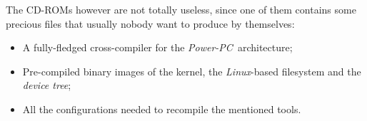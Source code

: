 \documentclass[10pt,a4paper]{article}
\newcommand{\TechName}[1]{\emph{{#1}}}
\newcommand{\PPC}{\TechName{Power-PC}}
\newcommand{\BusyBox}{\TechName{Linux}}
\begin{document}
        The CD-ROMs however are not totally useless, since one of them
        contains some precious files that usually nobody want to produce
        by themselves:
        \begin{itemize}

            \item   A fully-fledged cross-compiler for the \PPC\
                    architecture;

            \item   Pre-compiled binary images of the kernel, the
                    \BusyBox-based filesystem and the \emph{device tree};

            \item   All the configurations needed to recompile the
                    mentioned tools.

        \end{itemize}
\end{document}
